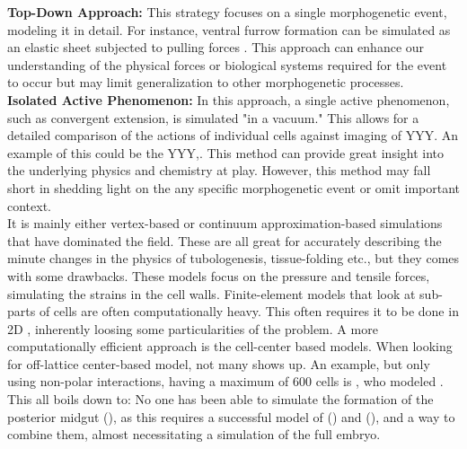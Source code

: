 \textbf{Top-Down Approach:} This strategy focuses on a single morphogenetic event, modeling it in detail. For instance, ventral furrow formation can be simulated as an elastic sheet subjected to pulling forces . This approach can enhance our understanding of the physical forces or biological systems required for the event to occur but may limit generalization to other morphogenetic processes.\\

\textbf{Isolated Active Phenomenon:} In this approach, a single active phenomenon, such as convergent extension, is simulated "in a vacuum." This allows for a detailed comparison of the actions of individual cells against imaging of YYY. An example of this could be the YYY,.  This method can provide great insight into the underlying physics and chemistry at play. However, this method may fall short in shedding light on the any specific morphogenetic event or omit important context.\\

It is mainly either vertex-based or continuum approximation-based simulations that have dominated the field. These are all great for accurately describing the minute changes in the physics of tubologenesis, tissue-folding etc., but they comes with some drawbacks. These  models focus on the pressure and tensile forces, simulating the strains in the cell walls. Finite-element models that look at sub-parts of cells are often computationally heavy. This often requires it to be done in 2D \cite{krajnc2018fluidization}, inherently loosing some particularities of the problem. A more computationally efficient approach is the cell-center based models. When looking for off-lattice center-based model, not many shows up. An example, but only using non-polar interactions, having a maximum of 600 cells is , who modeled .\\

This all boils down to: No one has been able to simulate the formation of the posterior midgut (), as this requires a successful model of () and (), and a way to combine them, almost necessitating a simulation of the full embryo.



% 


